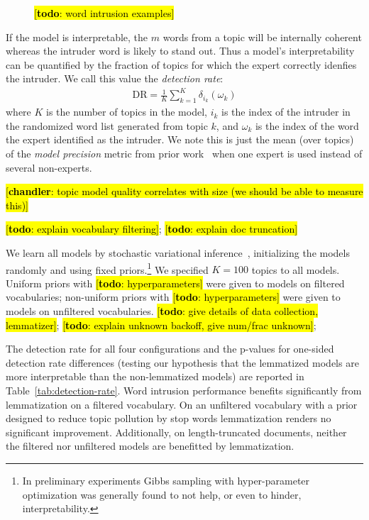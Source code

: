 \documentclass[11pt,letterpaper]{article}
\newcommand{\diracdelta}[2]{\delta_{#1}\left(#2\right)}
\newcommand{\DR}{\ensuremath{\textrm{DR}}}
\newcommand{\Note}[3]{\sethlcolor{#2}\hl{[\textbf{#1}: #3]}}
\newcommand{\chandler}[1]{\Note{chandler}{pink}{#1}}
\newcommand{\todo}[1]{\Note{todo}{red}{#1}}
\begin{document}
{\begin{figure}
    \caption{\todo{word intrusion examples}}
    \label{fig:word-intrusion}
\end{figure}

If the model is interpretable, the $m$ words from a topic will be
internally coherent whereas the intruder word is likely to stand out.
Thus a model's interpretability can be quantified by the fraction
of topics for which the expert correctly idenfies the intruder.  We
call this value the \emph{detection rate}:
\begin{align*}
    \DR = \frac{1}{K} \sum_{k=1}^K \diracdelta{i_k}{\omega_k}
\end{align*}
where $K$ is the number of topics in the model, $i_k$ is the index
of the intruder in the randomized word list generated from topic $k$,
and $\omega_k$ is the index of the word the expert identified as the
intruder.  We note this is just the mean (over topics) of the
\emph{model precision} metric from prior work~\cite{chang2009}
when one expert is used instead of several non-experts.

\chandler{topic model quality correlates with size (we should be
          able to measure this)} \cite{mimno2011}

\todo{explain vocabulary filtering};
\todo{explain doc truncation}

We learn all models by stochastic variational
inference~\cite{hoffman2013}, initializing the models randomly and
using fixed priors.\footnote{In preliminary experiments Gibbs
sampling with hyper-parameter optimization was generally found to not
help, or even to hinder, interpretability.}
We specified $K = 100$ topics to all models.
Uniform priors with \todo{hyperparameters} were given to models on
filtered vocabularies; non-uniform priors with \todo{hyperparameters}
were given to models on unfiltered vocabularies.
\todo{give details of data collection, lemmatizer};
\todo{explain unknown backoff, give num/frac unknown};

The detection rate for all four configurations and the
p-values for one-sided detection rate differences (testing our
hypothesis that the lemmatized models are more interpretable than the
non-lemmatized models) are reported in
Table~\ref{tab:detection-rate}.  Word intrusion performance benefits
significantly from lemmatization on a filtered vocabulary.  On an
unfiltered vocabulary with a prior designed to reduce topic pollution
by stop words lemmatization renders no significant improvement.
Additionally, on length-truncated documents, neither the filtered nor
unfiltered models are benefitted by lemmatization.

}
\end{document}
